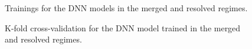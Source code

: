 \begin{figure}[ht]
      \centering
       \caption{Trainings for the DNN models in the merged and resolved regimes.}
       \label{fig:LossAndAccuracy}
\end{figure}

\begin{figure}[ht]
      \centering
       \caption{K-fold cross-validation for the DNN model trained in the merged and resolved regimes.}
       \label{fig:kfoldValidations}
\end{figure}


